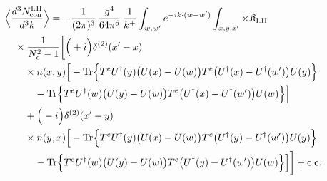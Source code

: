 \begin{align}\label{eq:S-I.II-2}
&\Big\langle\frac{d^{3}N^{\rm I.II}_{{\rm con}}}{d^{3}k}\Big\rangle=-\frac{1}{(2\pi)^{3}}\, \frac{g^{4}}{64\pi^{6}}\, \frac{1}{k^{+}} \int_{w,w'}e^{-ik\cdot(w-w')} \int_{x,y,x'} \times \mathfrak{K}_{\rm I.II}\notag\\
&\quad \times \frac{1}{N_{c}^{2}-1}\bigg[\Big(+i\Big)\delta^{(2)}(x'-x)\notag\\
&\quad\quad \times n(x,y)\Big[-{\rm Tr}\Big\{T^{e}U^{\dagger}(y)\big(U(x)-U(w)\big)T^{e}\big(U^{\dagger}(x)-U^{\dagger}(w')\big)U(y)\Big\}\notag\\
&\quad\quad\quad -{\rm Tr}\Big\{T^{e}U^{\dagger}(w)\big(U(y)-U(w)\big)T^{e}\big(U^{\dagger}(x)-U^{\dagger}(w')\big)U(w)\Big\}\Big]\notag\\
&\quad\quad +\Big(-i\Big)\delta^{(2)}(x'-y)\notag\\
&\quad\quad \times n(y,x)\Big[-{\rm Tr}\Big\{T^{e}U^{\dagger}(y)\big(U(x)-U(w)\big)T^{e}\big(U^{\dagger}(y)-U^{\dagger}(w')\big)U(y)\Big\}\notag\\
&\quad\quad\quad -{\rm Tr}\Big\{T^{e}U^{\dagger}(w)\big(U(y)-U(w)\big)T^{e}\big(U^{\dagger}(y)-U^{\dagger}(w')\big)U(w)\Big\}\Big]\bigg] +{\rm c.c.}
\end{align}
